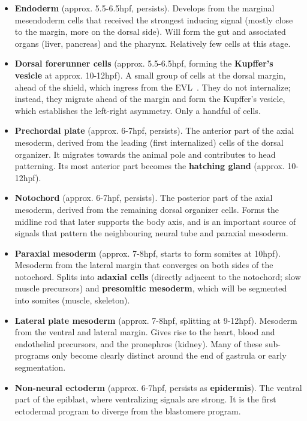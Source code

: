\documentclass[11pt,a4paper]{article}
\begin{document}
\begin{itemize}
	\item \textbf{Endoderm} (approx. 5.5-6.5hpf, persists). Develops from the marginal mesendoderm cells that received the strongest inducing signal (mostly close to the margin, more on the dorsal side). Will form the gut and associated organs (liver, pancreas) and the pharynx. Relatively few cells at this stage.
	\item \textbf{Dorsal forerunner cells} (approx. 5.5-6.5hpf, forming the \textbf{Kupffer's vesicle} at approx. 10-12hpf). A small group of cells at the dorsal margin, ahead of the shield, which ingress from the EVL~\cite{oteiza2008,warga2018}. They do not internalize; instead, they migrate ahead of the margin and form the Kupffer's vesicle, which establishes the left-right asymmetry. Only a handful of cells.
	\item \textbf{Prechordal plate} (approx. 6-7hpf, persists). The anterior part of the axial mesoderm, derived from the leading (first internalized) cells of the dorsal organizer. It migrates towards the animal pole and contributes to head patterning. Its most anterior part becomes the \textbf{hatching gland} (approx. 10-12hpf).
	\item \textbf{Notochord} (approx. 6-7hpf, persists). The posterior part of the axial mesoderm, derived from the remaining dorsal organizer cells. Forms the midline rod that later supports the body axis, and is an important source of signals that pattern the neighbouring neural tube and paraxial mesoderm.
	\item \textbf{Paraxial mesoderm} (approx. 7-8hpf, starts to form somites at 10hpf). Mesoderm from the lateral margin that converges on both sides of the notochord. Splits into \textbf{adaxial cells} (directly adjacent to the notochord; slow muscle precursors) and \textbf{presomitic mesoderm}, which will be segmented into somites (muscle, skeleton).
	\item \textbf{Lateral plate mesoderm} (approx. 7-8hpf, splitting at 9-12hpf). Mesoderm from the ventral and lateral margin. Gives rise to the heart, blood and endothelial precursors, and the pronephros (kidney). Many of these sub-programs only become clearly distinct around the end of gastrula or early segmentation.
	\item \textbf{Non-neural ectoderm} (approx. 6-7hpf, persists as \textbf{epidermis}). The ventral part of the epiblast, where ventralizing signals are strong. It is the first ectodermal program to diverge from the blastomere program.

\end{itemize}
\end{document}
